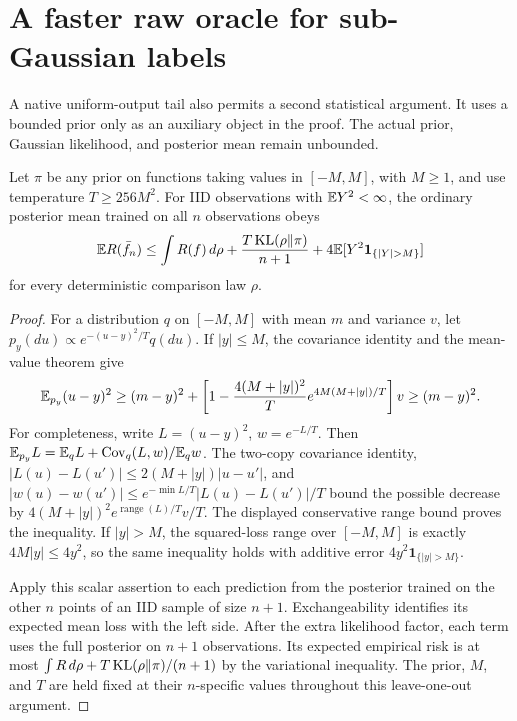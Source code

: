 \section{A faster raw oracle for sub-Gaussian labels}
\label{sec:raw-truncation-transfer}
A native uniform-output tail also permits a second statistical argument.
It uses a bounded prior only as an auxiliary object in the proof. The
actual prior, Gaussian likelihood, and posterior mean remain unbounded.

\begin{lemma}
\label{lem:bounded-finitevariance-loo}
Let $\pi$ be any prior on functions taking values in $[-M,M]$, with
$M\ge1$, and use temperature $T\ge256M^2$. For IID observations with
$\mathbb E Y^2<\infty$, the ordinary posterior mean trained on all $n$
observations obeys
\[
 \E R(\bar f_n)\le\int R(f)\,d\rho
       +\frac{T\KL(\rho\Vert\pi)}{n+1}
       +4\E[Y^2\mathbf1_{\{|Y|>M\}}]
\]
for every deterministic comparison law $\rho$.
\end{lemma}
\begin{proof}
For a distribution $q$ on $[-M,M]$ with mean $m$ and variance $v$,
let $p_y(du)\propto e^{-(u-y)^2/T}q(du)$. If $|y|\le M$, the
covariance identity and the mean-value theorem give
\[
 \mathbb E_{p_y}(u-y)^2\ge(m-y)^2+
 \left[1-\frac{4(M+|y|)^2}{T}
           e^{4M(M+|y|)/T}\right]v\ge(m-y)^2.
\]
For completeness, write $L=(u-y)^2$, $w=e^{-L/T}$. Then
$\mathbb E_{p_y}L=\mathbb E_qL+\operatorname{Cov}_q(L,w)/\mathbb E_qw$.
The two-copy covariance identity, $|L(u)-L(u')|\le
2(M+|y|)|u-u'|$, and
$|w(u)-w(u')|\le e^{-\min L/T}|L(u)-L(u')|/T$
bound the possible decrease by
$4(M+|y|)^2e^{\operatorname{range}(L)/T}v/T$.
The displayed conservative range bound proves the inequality.
If $|y|>M$, the squared-loss range over $[-M,M]$ is exactly
$4M|y|\le4y^2$, so the same inequality holds with additive error
$4y^2\mathbf1_{\{|y|>M\}}$.

Apply this scalar assertion to each prediction from the posterior
trained on the other $n$ points of an IID sample of size $n+1$.
Exchangeability identifies its expected mean loss with the left side.
After the extra likelihood factor, each term uses the full posterior
on $n+1$ observations. Its expected empirical risk is at most
$\int R\,d\rho+T\operatorname{KL}(\rho\Vert\pi)/(n+1)$ by the variational
inequality. The prior, $M$, and $T$ are held fixed at their
$n$-specific values throughout this leave-one-out argument.
\end{proof}

